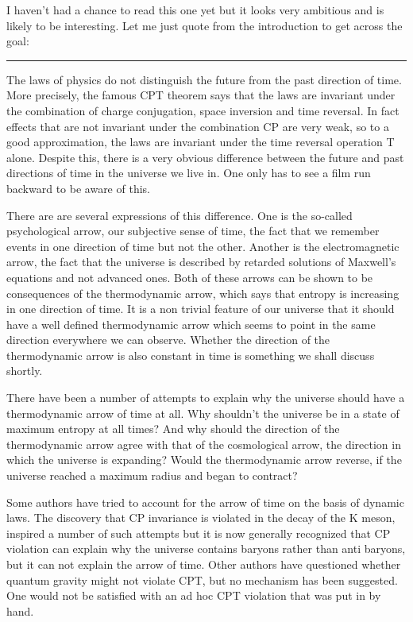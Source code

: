 I haven't had a chance to read this one yet but it looks very ambitious
and is likely to be interesting.  Let me just quote from the introduction
to get across the goal:

\par\noindent\rule{\textwidth}{0.4pt}
The laws of physics do not distinguish the future from the past direction
of time. More precisely, the famous CPT theorem says that
the laws are invariant under the combination of charge conjugation, space
inversion and time reversal. In fact effects that are not invariant
under the combination CP are very weak, so to a good approximation, the
laws are invariant under the time reversal operation T alone. Despite
this, there is a very obvious difference between the future and past
directions of time in the universe we live in. One only has to see a
film run backward to be aware of this. 

There are are several expressions of this difference. One is the so-called
psychological arrow, our subjective sense of time, the fact that we
remember events in one direction of time but not the other. Another is the
electromagnetic arrow, the fact that the universe is described by  retarded
solutions of Maxwell's equations and not advanced ones. Both of these
arrows can be shown to be consequences of the thermodynamic arrow, which
says that entropy is increasing in one direction of time. It is a non
trivial feature of our universe that it should have a well defined
thermodynamic arrow which seems to point in the same direction everywhere
we can observe. Whether the direction of the thermodynamic arrow is also
constant in time is something we shall discuss shortly.

There have been a number of attempts to explain why the universe should
have a thermodynamic arrow of time at all. Why shouldn't the universe be
in a state of maximum entropy at all times? And why should the direction
of the thermodynamic arrow agree with that of the cosmological arrow, the
direction in which the universe is expanding? Would the thermodynamic
arrow reverse, if the universe reached a maximum radius and began to
contract?

Some authors have tried to account for the arrow of time on the basis of
dynamic laws. The discovery that CP invariance is violated in the decay of
the K meson, inspired a number of such attempts but it is
now generally recognized that CP violation can explain why the universe
contains baryons rather than anti baryons, but it can not explain the
arrow of time. Other authors have questioned whether quantum
gravity might not violate CPT, but no mechanism has been suggested. One would
not be satisfied with an ad hoc CPT violation that was put in by hand.

